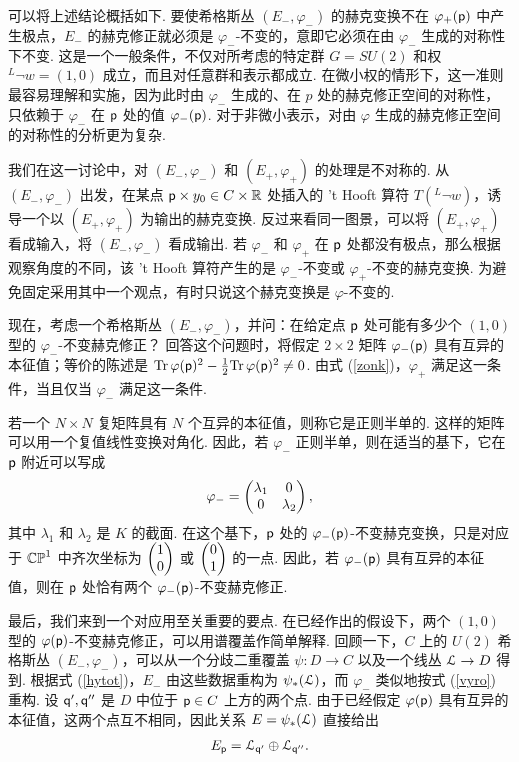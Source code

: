 可以将上述结论概括如下.
要使希格斯丛 $(E_-,\varphi_-)$ 的赫克变换不在 $\varphi_+(\pp)$ 中产生极点，$E_-$ 的赫克修正就必须是 $\varphi_-$-不变的，意即它必须在由 $\varphi_-$ 生成的对称性下不变.
这是一个一般条件，不仅对所考虑的特定群 $G=SU(2)$ 和权 $^L\neg w=(1,0)$ 成立，而且对任意群和表示都成立.
在微小权的情形下，这一准则最容易理解和实施，因为此时由 $\varphi_-$ 生成的、在 $p$ 处的赫克修正空间的对称性，只依赖于 $\varphi_-$ 在 $\pp$ 处的值 $\varphi_-(\pp)$.
对于非微小表示，对由 $\varphi$ 生成的赫克修正空间的对称性的分析更为复杂.

我们在这一讨论中，对 $(E_-,\varphi_-)$ 和 $(E_+,\varphi_+)$ 的处理是不对称的.
从 $(E_-,\varphi_-)$ 出发，在某点 $\pp\times y_0\in C\times \R$ 处插入的 't Hooft 算符 $T(^L\neg w)$，诱导一个以 $(E_+,\varphi_+)$ 为输出的赫克变换.
反过来看同一图景，可以将 $(E_+,\varphi_+)$ 看成输入，将 $(E_-,\varphi_-)$ 看成输出.
若 $\varphi_-$ 和 $\varphi_+$ 在 $\pp$ 处都没有极点，那么根据观察角度的不同，该 't Hooft 算符产生的是 $\varphi_-$-不变或 $\varphi_+$-不变的赫克变换.
为避免固定采用其中一个观点，有时只说这个赫克变换是 $\varphi$-不变的.

现在，考虑一个希格斯丛 $(E_-,\varphi_-)$，并问：在给定点 $\pp$ 处可能有多少个 $(1,0)$ 型的 $\varphi_-$-不变赫克修正？
回答这个问题时，将假定 $2\times 2$ 矩阵 $\varphi_-(\pp)$ 具有互异的本征值；等价的陈述是 $\Tr\,\varphi(\pp)^2-\frac{1}{2}
\Tr\,\varphi(\pp)^2\not=0$.
由式 (\ref{zonk})，$\varphi_+$ 满足这一条件，当且仅当 $\varphi_-$ 满足这一条件.

若一个 $N\times N$ 复矩阵具有 $N$ 个互异的本征值，则称它是正则半单的.
这样的矩阵可以用一个复值线性变换对角化.
因此，若 $\varphi_-$ 正则半单，则在适当的基下，它在 $\pp$ 附近可以写成
\begin{equation}\label{omonk}\varphi_-=\begin{pmatrix}\lambda_1 & 0 \cr 0 & \lambda_2\end{pmatrix},\end{equation}
其中 $\lambda_1$ 和 $\lambda_2$ 是 $K$ 的截面.
在这个基下，$\pp$ 处的 $\varphi_-(\pp)$-不变赫克变换，只是对应于 $\Bbb{CP}^1$ 中齐次坐标为 $\begin{pmatrix}1 \cr 0\end{pmatrix}$ 或 $\begin{pmatrix}0 \cr 1\end{pmatrix}$ 的一点.
因此，若 $\varphi_-(\pp)$ 具有互异的本征值，则在 $\pp$ 处恰有两个 $\varphi_-(\pp)$-不变赫克修正.

最后，我们来到一个对应用至关重要的要点.
在已经作出的假设下，两个 $(1,0)$ 型的 $\varphi(\pp)$-不变赫克修正，可以用谱覆盖作简单解释.
回顾一下，$C$ 上的 $U(2)$ 希格斯丛 $(E_-,\varphi_-)$，可以从一个分歧二重覆盖 $\psi:D\to C$ 以及一个线丛 $\L\to D$ 得到.
根据式 (\ref{hytot})，$E_-$ 由这些数据重构为 $\psi_*(\L)$，而 $\varphi_-$ 类似地按式 (\ref{vyro}) 重构.
设 $\qq',\qq''$ 是 $D$ 中位于 $\pp\in C$ 上方的两个点.
由于已经假定 $\varphi(\pp)$ 具有互异的本征值，这两个点互不相同，因此关系 $E=\psi_*(\L)$ 直接给出
\begin{equation}\label{belf} E_\pp=\L_{\qq'}\oplus \L_{\qq''}. \end{equation}

